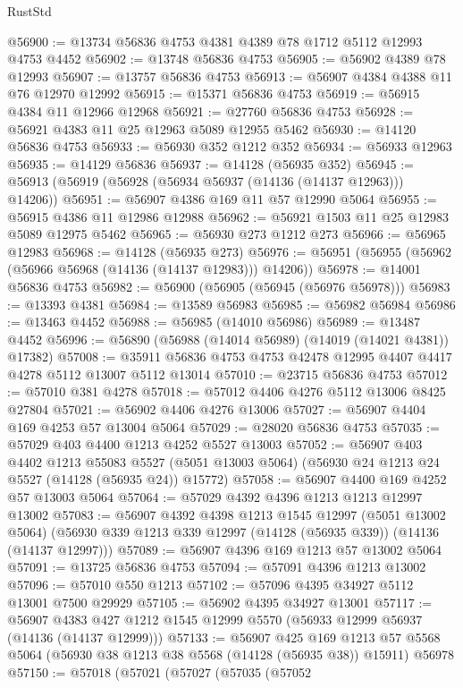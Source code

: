 \begin{lexlean}{RustStd}
\begin{coremodule}
@56900 := @13734 @56836 @4753 @4381 @4389 @78 @1712 @5112 @12993 @4753 @4452
@56902 := @13748 @56836 @4753
@56905 := @56902 @4389 @78 @12993
@56907 := @13757 @56836 @4753
@56913 := @56907 @4384 @4388 @11 @76 @12970 @12992
@56915 := @15371 @56836 @4753
@56919 := @56915 @4384 @11 @12966 @12968
@56921 := @27760 @56836 @4753
@56928 := @56921 @4383 @11 @25 @12963 @5089 @12955 @5462
@56930 := @14120 @56836 @4753
@56933 := @56930 @352 @1212 @352
@56934 := @56933 @12963
@56935 := @14129 @56836
@56937 := @14128 (@56935 @352)
@56945 := @56913 (@56919 (@56928 (@56934 @56937 (@14136 (@14137 @12963))) @14206))
@56951 := @56907 @4386 @169 @11 @57 @12990 @5064
@56955 := @56915 @4386 @11 @12986 @12988
@56962 := @56921 @1503 @11 @25 @12983 @5089 @12975 @5462
@56965 := @56930 @273 @1212 @273
@56966 := @56965 @12983
@56968 := @14128 (@56935 @273)
@56976 := @56951 (@56955 (@56962 (@56966 @56968 (@14136 (@14137 @12983))) @14206))
@56978 := @14001 @56836 @4753
@56982 := @56900 (@56905 (@56945 (@56976 @56978)))
@56983 := @13393 @4381
@56984 := @13589 @56983
@56985 := @56982 @56984
@56986 := @13463 @4452
@56988 := @56985 (@14010 @56986)
@56989 := @13487 @4452
@56996 := @56890 (@56988 (@14014 @56989) (@14019 (@14021 @4381)) @17382)
@57008 := @35911 @56836 @4753 @4753 @42478 @12995 @4407 @4417 @4278 @5112 @13007 @5112 @13014
@57010 := @23715 @56836 @4753
@57012 := @57010 @381 @4278
@57018 := @57012 @4406 @4276 @5112 @13006 @8425 @27804
@57021 := @56902 @4406 @4276 @13006
@57027 := @56907 @4404 @169 @4253 @57 @13004 @5064
@57029 := @28020 @56836 @4753
@57035 := @57029 @403 @4400 @1213 @4252 @5527 @13003
@57052 := @56907
    @403
    @4402
    @1213
    @55083
    @5527
    (@5051 @13003 @5064)
    (@56930 @24 @1213 @24 @5527 (@14128 (@56935 @24)) @15772)
@57058 := @56907 @4400 @169 @4252 @57 @13003 @5064
@57064 := @57029 @4392 @4396 @1213 @1213 @12997 @13002
@57083 := @56907
    @4392
    @4398
    @1213
    @1545
    @12997
    (@5051 @13002 @5064)
    (@56930 @339 @1213 @339 @12997 (@14128 (@56935 @339)) (@14136 (@14137 @12997)))
@57089 := @56907 @4396 @169 @1213 @57 @13002 @5064
@57091 := @13725 @56836 @4753
@57094 := @57091 @4396 @1213 @13002
@57096 := @57010 @550 @1213
@57102 := @57096 @4395 @34927 @5112 @13001 @7500 @29929
@57105 := @56902 @4395 @34927 @13001
@57117 := @56907 @4383 @427 @1212 @1545 @12999 @5570 (@56933 @12999 @56937 (@14136 (@14137 @12999)))
@57133 := @56907
    @425
    @169
    @1213
    @57
    @5568
    @5064
    (@56930 @38 @1213 @38 @5568 (@14128 (@56935 @38)) @15911)
    @56978
@57150 := @57018
    (@57021
      (@57027
        (@57035
          (@57052

\end{coremodule}
\end{lexlean}
